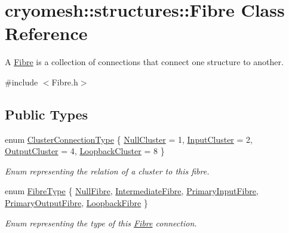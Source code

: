 \hypertarget{classcryomesh_1_1structures_1_1Fibre}{\section{cryomesh\-:\-:structures\-:\-:\-Fibre \-Class \-Reference}
\label{classcryomesh_1_1structures_1_1Fibre}
}


\-A \hyperlink{classcryomesh_1_1structures_1_1Fibre}{\-Fibre} is a collection of connections that connect one structure to another.  




{\ttfamily \#include $<$\-Fibre.\-h$>$}

\subsection*{\-Public \-Types}
\begin{DoxyCompactItemize}
\item 
enum \hyperlink{classcryomesh_1_1structures_1_1Fibre_a1bae341ec1ee07bdc7855b287bee2061}{\-Cluster\-Connection\-Type} \{ \hyperlink{classcryomesh_1_1structures_1_1Fibre_a1bae341ec1ee07bdc7855b287bee2061aabc802b96fdcb5b3652b911ba4b245dd}{\-Null\-Cluster} =  1, 
\hyperlink{classcryomesh_1_1structures_1_1Fibre_a1bae341ec1ee07bdc7855b287bee2061a6ba67168d6814daae19c08e089b9221e}{\-Input\-Cluster} = 2, 
\hyperlink{classcryomesh_1_1structures_1_1Fibre_a1bae341ec1ee07bdc7855b287bee2061aa7d846663457afd6da1e28d201f62656}{\-Output\-Cluster} = 4, 
\hyperlink{classcryomesh_1_1structures_1_1Fibre_a1bae341ec1ee07bdc7855b287bee2061add322fb6cff1b80f969b078c59f97fce}{\-Loopback\-Cluster} = 8
 \}
\begin{DoxyCompactList}\small\item\em \-Enum representing the relation of a cluster to this fibre. \end{DoxyCompactList}\item 
enum \hyperlink{classcryomesh_1_1structures_1_1Fibre_aecbba6d46a76f888b3722491b674f5e4}{\-Fibre\-Type} \{ \*
\hyperlink{classcryomesh_1_1structures_1_1Fibre_aecbba6d46a76f888b3722491b674f5e4a75309eba2cce59260e4f3e51bae87447}{\-Null\-Fibre}, 
\hyperlink{classcryomesh_1_1structures_1_1Fibre_aecbba6d46a76f888b3722491b674f5e4a69d28022ab4829994a47b285abbbbf1e}{\-Intermediate\-Fibre}, 
\hyperlink{classcryomesh_1_1structures_1_1Fibre_aecbba6d46a76f888b3722491b674f5e4a04c484accec936ca5b35fed02fd3affd}{\-Primary\-Input\-Fibre}, 
\hyperlink{classcryomesh_1_1structures_1_1Fibre_aecbba6d46a76f888b3722491b674f5e4a09e0e43a8d02ccfe05dfe8c0b5cce1c6}{\-Primary\-Output\-Fibre}, 
\*
\hyperlink{classcryomesh_1_1structures_1_1Fibre_aecbba6d46a76f888b3722491b674f5e4abb9c562751800615ea00d21c6d1a0dfe}{\-Loopback\-Fibre}
 \}
\begin{DoxyCompactList}\small\item\em \-Enum representing the type of this \hyperlink{classcryomesh_1_1structures_1_1Fibre}{\-Fibre} connection. \end{DoxyCompactList}\end{DoxyCompactItemize}
